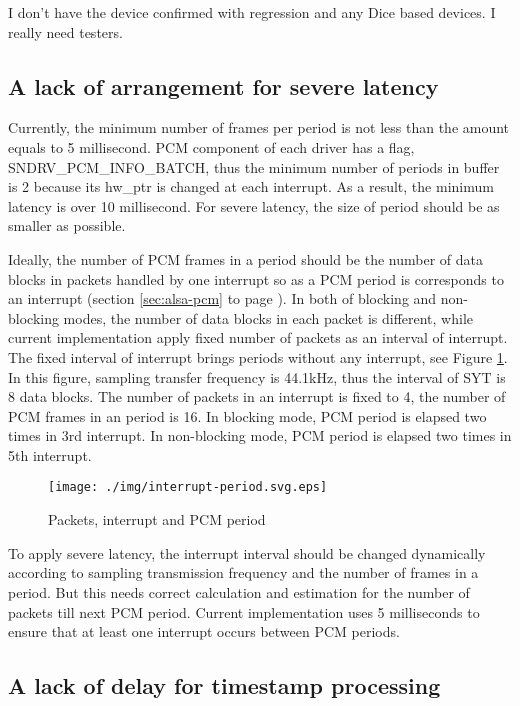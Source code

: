 \documentclass[onecolumn]{article}
\begin{document}
I don't have the device confirmed with regression and any Dice based devices. I really need testers.

\subsection{A lack of arrangement for severe latency}
Currently, the minimum number of frames per period is not less than the amount equals to 5 millisecond. PCM component of each driver has a flag, SNDRV\_PCM\_INFO\_BATCH, thus the minimum number of periods in buffer is 2 because its hw\_ptr is changed at each interrupt. As a result, the minimum latency is over 10 millisecond. For severe latency, the size of period should be as smaller as possible.

Ideally, the number of PCM frames in a period should be the number of data blocks in packets handled by one interrupt so as a PCM period is corresponds to an interrupt (section \ref{sec:alsa-pcm} to page \pageref{sec:alsa-pcm}). In both of blocking and non-blocking modes, the number of data blocks in each packet is different, while current implementation apply fixed number of packets as an interval of interrupt. The fixed interval of interrupt brings periods without any interrupt, see Figure \ref{fig:interrupt-period}. In this figure, sampling transfer frequency is 44.1kHz, thus the interval of SYT is 8 data blocks. The number of packets in an interrupt is fixed to 4, the number of PCM frames in an period is 16. In blocking mode, PCM period is elapsed two times in 3rd interrupt. In non-blocking mode, PCM period is elapsed two times in 5th interrupt.

\begin{figure}[H]
	\centering
	\texttt{[image: ./img/interrupt-period.svg.eps]}
	\caption{{Packets, interrupt and PCM period}}
	\label{fig:interrupt-period}
\end{figure}

To apply severe latency, the interrupt interval should be changed dynamically according to sampling transmission frequency and the number of frames in a period. But this needs correct calculation and estimation for the number of packets till next PCM period. Current implementation uses 5 milliseconds to ensure that at least one interrupt occurs between PCM periods.

\subsection{A lack of delay for timestamp processing}
\end{document}

